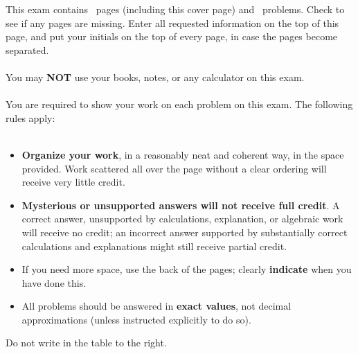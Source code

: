 \documentclass[11pt]{exam}%
\begin{document}
This exam contains \numpages\ pages (including this cover page) and \numquestions\ problems.  Check to see if any pages are missing.  Enter all requested information on the top of this page, and put your initials on the top of every page, in case the pages become separated.\\
\\
You may \textbf{NOT} use your books, notes, or any calculator on this exam.\\
\\
You are required to show your work on each problem on this exam.  The following rules apply:\\
\\%
\begin{minipage}[t]{3.7in}%
\vspace{0pt}%
\begin{itemize}%
\item%
\textbf{Organize your work}, in a reasonably neat and coherent way, in
            the space provided. Work scattered all over the page without a clear ordering will
            receive very little credit.%
\item%
\textbf{Mysterious or unsupported answers will not receive full
credit}.  A correct answer, unsupported by calculations, explanation,
or algebraic work will receive no credit; an incorrect answer supported
by substantially correct calculations and explanations might still receive
partial credit.
\item%
If you need more space, use the back of the pages; clearly \textbf{indicate} when you have done this.%
\item%
All problems should be answered in \textbf{exact values}, not decimal approximations (unless instructed explicitly to do so).%
\end{itemize}%
Do not write in the table to the right.%
\end{minipage}%
\hfill%
\begin{minipage}[t]{2.3in}%
\vspace{0pt}%
%
%
\addpoints%
\gradetable[v]%
\end{minipage}%
\newpage%
\addpoints%
\begin{questions}%
\question%
%
\end{questions}%
\end{document}

